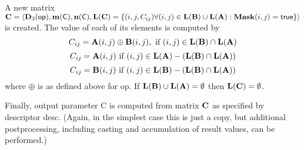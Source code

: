 A new matrix ${\bf C} = \langle \bold{D}_3({\sf op}),
\bold{m}({\bf \sf C}), \bold{n}({\bf \sf C}), \bold{L}({\bf C}) = \{(i,j,C_{ij})  \forall (i,j) \in
\bold{L}({\bf B}) \cup \bold{L}({\bf A}) : {\bf Mask}(i,j)
= {\sf true} \} \rangle$ is created.  The value of each of its
elements is computed by 
\[
C_{ij} = {\bf A}(i,j) \oplus {\bf B}(i,j), \ \mbox{if}\  (i,j) \in  \bold{L}({\bf B}) \cap \bold{L}({\bf A})
\]
\[
C_{ij} = {\bf A}(i,j) \ \mbox{if}\  (i,j) \in  \bold{L}({\bf A}) - (\bold{L}({\bf B}) \cap \bold{L}({\bf A}))
\]
\[
C_{ij} = {\bf B}(i,j) \ \mbox{if}\  (i,j) \in  \bold{L}({\bf B}) - (\bold{L}({\bf B}) \cap \bold{L}({\bf A}))
\]
where $\oplus$ is as defined above for {\sf op}.
If $\bold{L}({\bf B}) \cup \bold{L}({\bf A}) = \emptyset$
then $\bold{L}({\bf C}) = \emptyset$.

Finally, output parameter {\sf C} is computed from matrix ${\bf C}$
as specified by descriptor {\sf desc}. (Again, in the simplest case this
is just a copy, but additional postprocessing, including casting and
accumulation of result values, can be performed.) 
